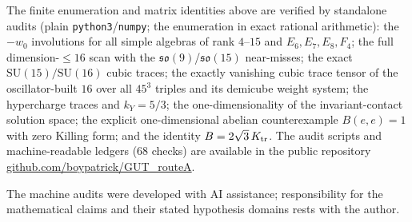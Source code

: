 \documentclass[
  aps,prd,superscriptaddress,nofootinbib,preprint
]{revtex4-2}
\theoremstyle{remark}
\newcommand{\SU}{\mathrm{SU}}
\newcommand{\Ktr}{K_{\rm tr}}
\begin{document}
The finite enumeration and matrix identities above are verified by standalone
audits (plain
\texttt{python3}/\texttt{numpy}; the enumeration in exact rational
arithmetic): the $-w_0$ involutions for all simple algebras of rank
$4$--$15$ and $E_6,E_7,E_8,F_4$; the full dimension-$\le16$ scan with
the $\mathfrak{so}(9)$/$\mathfrak{so}(15)$ near-misses; the exact
$\SU(15)/\SU(16)$ cubic traces; the exactly vanishing cubic trace
tensor of the oscillator-built $16$ over all $45^3$ triples and its
demicube weight system; the hypercharge traces and $k_Y=5/3$; the
one-dimensionality of the invariant-contact solution space; the explicit
one-dimensional abelian counterexample $B(e,e)=1$ with zero Killing form;
and the identity $B=2\sqrt3\,\Ktr$.  The audit scripts and machine-readable
ledgers (68 checks) are available in the public repository
\href{https://github.com/boypatrick/GUT_routeA}{github.com/boypatrick/GUT\_routeA}.

\begin{acknowledgments}
The machine audits were developed with AI assistance; responsibility for the
mathematical claims and their stated hypothesis domains rests with the author.
\end{acknowledgments}

\makeatletter
\let\pre@bibdata\@empty
\let\@bibdataout@rev\@bibdataout@aps
\makeatother

\end{document}
